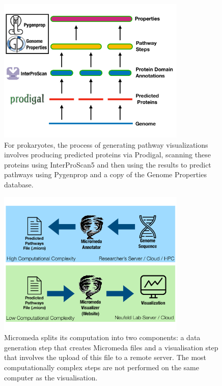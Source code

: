 \begin{figure}[!ht]
  \centering
	\includegraphics[width=0.8\textwidth]{media/micromeda-pipeline.pdf}
	 \caption{For prokaryotes, the process of generating pathway visualizations involves producing predicted proteins via Prodigal, scanning these proteins using InterProScan5 and then using the results to predict pathways using Pygenprop and a copy of the Genome Properties database.}
	 \label{fig:micromeda-levels}
\end{figure}

\begin{figure}[!ht]
  \centering
	\includegraphics[width=0.8\textwidth]{media/micromeda-file-generation.pdf}
	 \caption{Micromeda splits its computation into two components: a data generation step that creates Micromeda files and a visualisation step that involves the upload of this file to a remote server. The most computationally complex steps are not performed on the same computer as the visualisation.}
	 \label{fig:micromeda-file-generation}
\end{figure}

